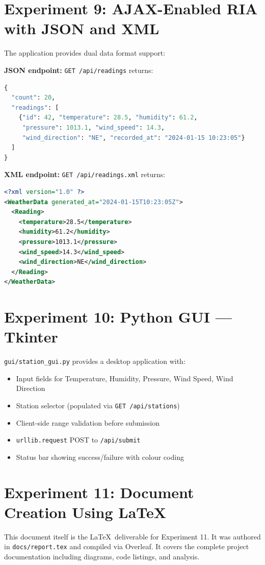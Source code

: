 \documentclass[12pt,a4paper]{article}
\begin{document}
\section{Experiment 9: AJAX-Enabled RIA with JSON and XML}

The application provides dual data format support:

\textbf{JSON endpoint:} \texttt{GET /api/readings} returns:
\begin{lstlisting}[language=Python, caption=Sample JSON response]
{
  "count": 20,
  "readings": [
    {"id": 42, "temperature": 28.5, "humidity": 61.2,
     "pressure": 1013.1, "wind_speed": 14.3,
     "wind_direction": "NE", "recorded_at": "2024-01-15 10:23:05"}
  ]
}
\end{lstlisting}

\textbf{XML endpoint:} \texttt{GET /api/readings.xml} returns:
\begin{lstlisting}[language=XML, caption=Sample XML response]
<?xml version="1.0" ?>
<WeatherData generated_at="2024-01-15T10:23:05Z">
  <Reading>
    <temperature>28.5</temperature>
    <humidity>61.2</humidity>
    <pressure>1013.1</pressure>
    <wind_speed>14.3</wind_speed>
    <wind_direction>NE</wind_direction>
  </Reading>
</WeatherData>
\end{lstlisting}

\section{Experiment 10: Python GUI — Tkinter}

\texttt{gui/station\_gui.py} provides a desktop application with:
\begin{itemize}
  \item Input fields for Temperature, Humidity, Pressure, Wind Speed, Wind Direction
  \item Station selector (populated via \texttt{GET /api/stations})
  \item Client-side range validation before submission
  \item \texttt{urllib.request} POST to \texttt{/api/submit}
  \item Status bar showing success/failure with colour coding
\end{itemize}

\section{Experiment 11: Document Creation Using \LaTeX}
This document itself is the \LaTeX\ deliverable for Experiment 11. It was authored in \texttt{docs/report.tex} and compiled via Overleaf. It covers the complete project documentation including diagrams, code listings, and analysis.
\end{document}
